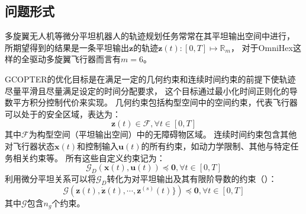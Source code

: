 \subsection{问题形式}\label{subsec:problem_formulation}
多旋翼无人机等微分平坦机器人的轨迹规划任务常常在其平坦输出空间中进行，
所期望得到的结果是一条平坦输出$\bm{z}$的轨迹$\bm{z}(t):[0, T]\mapsto\mathbb{R}_m$，
对于OmniHex这样的全驱动多旋翼飞行器而言有$m=6$。

GCOPTER的优化目标是在满足一定的几何约束和连续时间约束的前提下使轨迹尽量平滑且尽量满足设定的时间分配要求，
这个目标通过最小化时间正则化的导数平方积分控制代价来实现。
几何约束包括构型空间中的空间约束，代表飞行器可以处于的安全区域，表达为：
\begin{equation}
  \bm{z}(t) \in \mathcal{F}, \forall t \in  [0, T] \label{equ:spatial_constraints_in_c_space}
\end{equation}
其中$\mathcal{F}$为构型空间（平坦输出空间）中的无障碍物区域。
连续时间约束包含其他对飞行器状态$\bm{x}(t)$和控制输入$\bm{u}(t)$的所有约束，如动力学限制、其他与特定任务相关约束等。
所有这些自定义约束记为：
\begin{equation}
  \mathcal{G}_D(\bm{x}(t), \bm{u}(t)) \preceq \textbf{0}, \forall t \in [0, T]
  \label{equ:constraints_on_x_and_u}
\end{equation}
利用微分平坦关系可以将$\mathcal{G}_D$转化为对平坦输出及其有限阶导数的约束（）： 
\begin{equation}
  \mathcal{G}(\bm{z}(t), \dot{\bm{z}}(t), \cdots, \bm{z}^{(s)}(t)\}) \preceq \textbf{0}, \forall t \in [0, T]
  \label{equ:constraints_on_z}
\end{equation}
其中$\mathcal{G}$包含$n_g$个约束。

